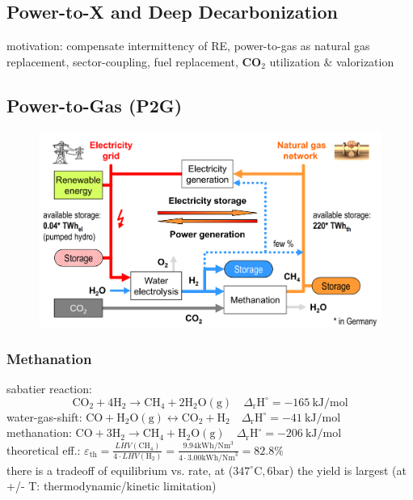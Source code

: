 \documentclass[a4paper,10pt,landscape]{scrartcl}
\begin{document}
\begin{multicols*}{3}
\section{Power-to-X and Deep Decarbonization}
motivation: compensate intermittency of RE, power-to-gas as natural gas replacement, sector-coupling, fuel replacement, $\mathbf{CO}_2$ utilization \& valorization

\subsection{Power-to-Gas (P2G)}
\begin{figure}[H]
    \centering
    \includegraphics[width=0.75\linewidth]{src/p2g.png}
\end{figure}

\subsubsection{Methanation}
sabatier reaction: $$
\mathrm{CO}_2+4 \mathrm{H}_2 \rightarrow \mathrm{CH}_4+2 \mathrm{H}_2 \mathrm{O}(\mathrm{g}) \quad \Delta_{\mathrm{r}} \mathrm{H}^{\circ}=-165 \mathrm{~kJ} / \mathrm{mol}
$$ 
water-gas-shift: $\mathrm{CO} + \mathrm{H}_2\mathrm{O(g)} \leftrightarrow \mathrm{CO}_2 + \mathrm{H}_2 \quad \Delta_{\mathrm{r}} \mathrm{H}^{\circ}=-41 \mathrm{~kJ} / \mathrm{mol}$ \\
methanation: $\mathrm{CO} + 3\mathrm{H}_2 \rightarrow \mathrm{CH}_4 + \mathrm{H}_2\mathrm{O(g)} \quad \Delta_{\mathrm{r}} \mathrm{H}^{\circ}=-206 \mathrm{~kJ} / \mathrm{mol}$ \\
theoretical eff.:
$
\varepsilon_{\mathrm{th}}=\frac{L H V\left(\mathrm{CH}_4\right)}{4 \cdot L H V\left(\mathrm{H}_2\right)}=\frac{9.94 \mathrm{kWh} / \mathrm{Nm}^3}{4 \cdot 3.00 \mathrm{kWh} / \mathrm{Nm}^3}=82.8 \%
$ \\
there is a tradeoff of equilibrium vs. rate, at ($347^\circ\mathrm{C}, 6\mathrm{bar}$) the yield is largest (at +/- T: thermodynamic/kinetic limitation)


\end{multicols*}
\end{document}
